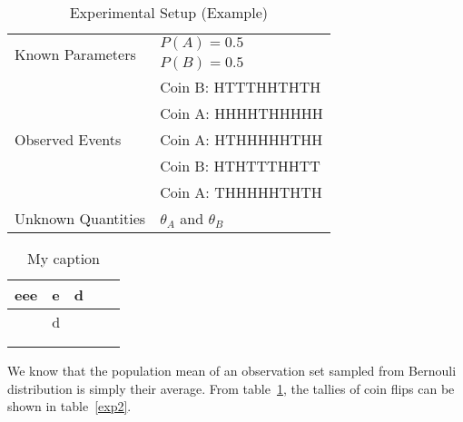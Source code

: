 \begin{table}[h]
\centering
\caption{Experimental Setup (Example)}
\label{exp1}
\begin{tabular}{|l|l|}
\hline
\multirow{2}{*}{Known Parameters}                 & $P(A)=0.5$ \\ \cline{2-2}
                                                  & $P(B)=0.5$ \\ \hline
                                                                  
\multirow{5}{*}{Observed Events} & Coin B: HTTTHHTHTH \\ \cline{2-2} 
                   & Coin A: HHHHTHHHHH \\ \cline{2-2} 
                   & Coin A: HTHHHHHTHH \\ \cline{2-2} 
                   & Coin B: HTHTTTHHTT \\ \cline{2-2} 
                   & Coin A: THHHHHTHTH \\ \hline
Unknown Quantities                  & $\theta_A$ and $\theta_B$ \\ \hline
           
\end{tabular}
\end{table}
\begin{table}[]
\centering
\caption{My caption}
\label{my-label}
\begin{tabular}{|l|l|l|l|l|}
\hline
eee & e          & d         &  &  \\ \hline
    & \multicolumn{2}{l|}{d} &  &  \\ \hline
    &            &           &  &  \\ \hline
    &            &           &  &  \\ \hline
\end{tabular}
\end{table}

We know that the population mean of an observation set sampled from Bernouli distribution is simply their average. From table~\ref{exp1}, the tallies of coin flips can be shown in table~\ref{exp2}.

